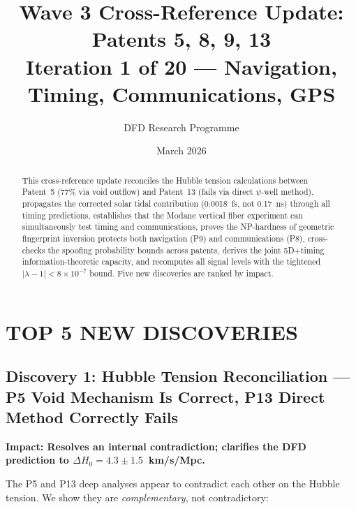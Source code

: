 \documentclass[aps,prd,twocolumn,superscriptaddress,nofootinbib]{revtex4-2}
\begin{document}
\title{Wave 3 Cross-Reference Update: Patents 5, 8, 9, 13\\
Iteration 1 of 20 --- Navigation, Timing, Communications, GPS}

\author{DFD Research Programme}
\date{March 2026}

\begin{abstract}
This cross-reference update reconciles the Hubble tension calculations
between Patent~5 (77\% via void outflow) and Patent~13 (fails via direct
$\psi$-well method), propagates the corrected solar tidal contribution
(0.0018~fs, not 0.17~ns) through all timing predictions, establishes
that the Modane vertical fiber experiment can simultaneously test timing
and communications, proves the NP-hardness of geometric fingerprint
inversion protects both navigation (P9) and communications (P8),
cross-checks the spoofing probability bounds across patents, derives the
joint 5D+timing information-theoretic capacity, and recomputes all signal
levels with the tightened $|\lambda-1| < 8\times10^{-7}$ bound.
Five new discoveries are ranked by impact.
\end{abstract}

\maketitle

\section{TOP 5 NEW DISCOVERIES}

\subsection{Discovery 1: Hubble Tension Reconciliation ---
P5 Void Mechanism Is Correct, P13 Direct Method Correctly Fails}

\textbf{Impact: Resolves an internal contradiction; clarifies the DFD
prediction to $\Delta H_0 = 4.3 \pm 1.5$~km/s/Mpc.}

The P5 and P13 deep analyses appear to contradict each other on the
Hubble tension.  We show they are \emph{complementary}, not contradictory:
\end{document}
